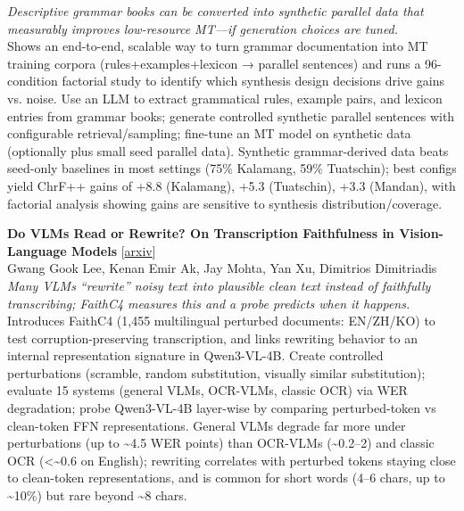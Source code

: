 \documentclass[12pt,letterpaper]{article}
\begin{document}
{\small\textit{Descriptive grammar books can be converted into synthetic parallel data that measurably improves low-resource MT---if generation choices are tuned.}}\\[1pt]
{\footnotesize Shows an end-to-end, scalable way to turn grammar documentation into MT training corpora (rules+examples+lexicon → parallel sentences) and runs a 96-condition factorial study to identify which synthesis design decisions drive gains vs. noise. Use an LLM to extract grammatical rules, example pairs, and lexicon entries from grammar books; generate controlled synthetic parallel sentences with configurable retrieval/sampling; fine-tune an MT model on synthetic data (optionally plus small seed parallel data). Synthetic grammar-derived data beats seed-only baselines in most settings (75\% Kalamang, 59\% Tuatschin); best configs yield ChrF++ gains of +8.8 (Kalamang), +5.3 (Tuatschin), +3.3 (Mandan), with factorial analysis showing gains are sensitive to synthesis distribution/coverage.}

\medskip

{\small\textbf{Do VLMs Read or Rewrite? On Transcription Faithfulness in Vision-Language Models}} {\scriptsize[\href{https://arxiv.org/abs/2607.21617}{arxiv}]}\\
{\scriptsize Gwang Gook Lee, Kenan Emir Ak, Jay Mohta, Yan Xu, Dimitrios Dimitriadis}\\

{\small\textit{Many VLMs ``rewrite'' noisy text into plausible clean text instead of faithfully transcribing; FaithC4 measures this and a probe predicts when it happens.}}\\[1pt]
{\footnotesize Introduces FaithC4 (1,455 multilingual perturbed documents: EN/ZH/KO) to test corruption-preserving transcription, and links rewriting behavior to an internal representation signature in Qwen3-VL-4B. Create controlled perturbations (scramble, random substitution, visually similar substitution); evaluate 15 systems (general VLMs, OCR-VLMs, classic OCR) via WER degradation; probe Qwen3-VL-4B layer-wise by comparing perturbed-token vs clean-token FFN representations. General VLMs degrade far more under perturbations (up to \textasciitilde{}4.5 WER points) than OCR-VLMs (\textasciitilde{}0.2--2) and classic OCR (<\textasciitilde{}0.6 on English); rewriting correlates with perturbed tokens staying close to clean-token representations, and is common for short words (4--6 chars, up to \textasciitilde{}10\%) but rare beyond \textasciitilde{}8 chars.}
\end{document}
